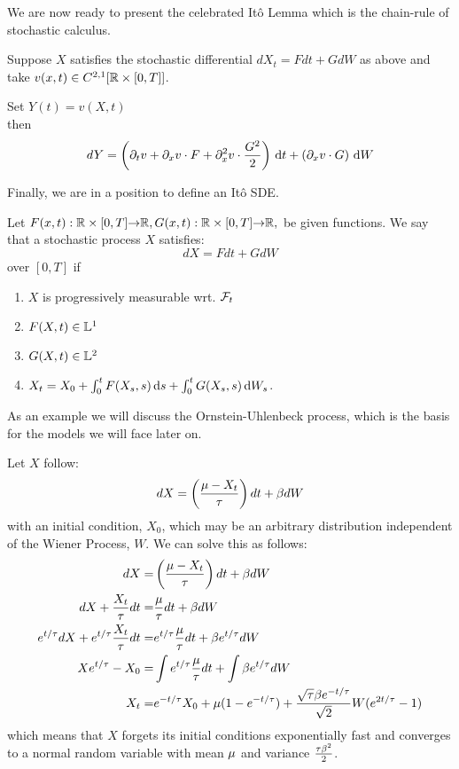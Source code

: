 We are now ready to present the celebrated It\^o Lemma which is the chain-rule of
stochastic calculus.

\begin{thm}[It\^o Lemma]
Suppose $X$ satisfies the stochastic differential $dX_t =
Fdt + G dW$ as above and take $v(x,t) \in C^{2,1}[ { \mathbb{R} } \times [0,T]]$.

Set $Y(t) = v(X,t)$
\\
then
$$
dY =  \left( {\partial}_t v + {\partial}_x v \cdot F + {\partial}^2_x v \cdot \frac{G^2}2 \right)
\, \mathrm{d} t + \left(   {\partial}_x v\cdot G  \right)\, \mathrm{d} W
$$
\end{thm} 

Finally, we are in a position to define an It\^o SDE. 

\begin{defn}[It\^o SDE] Let
$F(x,t):{ \mathbb{R} }\times [0,T]{\rightarrow} { \mathbb{R} },  G(x,t):{ \mathbb{R} }\times [0,T]{\rightarrow} { \mathbb{R} },$ be given functions.
We say that a stochastic process $X$ satisfies:
\begin{equation}
dX =F dt + G dW
\end{equation} 
over $[0,T]$ if
\begin{enumerate}
  \item $X$ is progressively measurable wrt. ${\mathcal{F}}_t$
  \item $F(X,t) \in {\mathbb{L}^1}$
  \item $G(X,t) \in {\mathbb{L}^2}$ 
  \item $X_t = X_0 + \int_0^t F(X_s, s) \, \mathrm{d} s + \int_0^t G(X_s, s) \, \mathrm{d} W_s$.
\end{enumerate}
\end{defn} 

As an example we will discuss the Ornstein-Uhlenbeck process, which is the
basis for the models we will face later on.
\begin{ex}[O-U Process] Let $X$ follow:
\begin{equation}
dX = \left( \frac {{\mu } -X_t}{{ \tau }} \right) dt + \beta dW
\label{eq:OU_equation_generic}
\end{equation}
with an initial condition, $X_0$, which may be an arbitrary distribution
independent of the Wiener Process, $W$.
We can solve this as follows: 
\begin{align*}
dX =& \left( \frac {{\mu } -X_t}{{ \tau }} \right)  dt + \beta dW
\\
dX + \frac {X_t}{{ \tau }} dt=&  \frac{{\mu }}{{ \tau }} dt + \beta dW
\\
e^{t/{ \tau }} dX + e^{t/{ \tau }}\frac {X_t}{{ \tau }} dt
=& e^{t/{ \tau }}\frac{{\mu }}{{ \tau }} dt + \beta e^{t/{ \tau }} dW
\\
Xe^{t/{ \tau }} - X_0 
=& \int  e^{t/{ \tau }}\frac{{\mu }}{{ \tau }} dt +  \int \beta e^{t/{ \tau }} dW
\\
X_t =& e^{-t/{ \tau }} X_0 + {\mu }(1-e^{-t/{ \tau }}) +  \frac{\sqrt{{ \tau }}\beta
e^{-t/{ \tau }}}{\sqrt{2}} W(e^{2t/{ \tau }}-1)
\end{align*}
which means that $X$ forgets its initial conditions exponentially fast and
converges to a normal random variable with mean ${\mu }$ and variance
$\tfrac{{ \tau } \beta^2}{2}$.
\end{ex}

